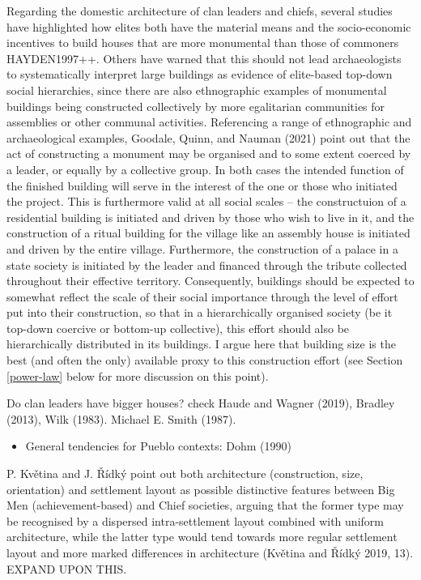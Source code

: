 \documentclass[
  12pt,
  a4paper, twoside]{book}
\providecommand{\tightlist}{%
  \setlength{\itemsep}{0pt}\setlength{\parskip}{0pt}}
\begin{document}
Regarding the domestic architecture of clan leaders and chiefs, several studies have highlighted how elites both have the material means and the socio-economic incentives to build houses that are more monumental than those of commoners HAYDEN1997++. Others have warned that this should not lead archaeologists to systematically interpret large buildings as evidence of elite-based top-down social hierarchies, since there are also ethnographic examples of monumental buildings being constructed collectively by more egalitarian communities for assemblies or other communal activities. Referencing a range of ethnographic and archaeological examples, Goodale, Quinn, and Nauman (2021) point out that the act of constructing a monument may be organised and to some extent coerced by a leader, or equally by a collective group. In both cases the intended function of the finished building will serve in the interest of the one or those who initiated the project. This is furthermore valid at all social scales -- the constructuion of a residential building is initiated and driven by those who wish to live in it, and the construction of a ritual building for the village like an assembly house is initiated and driven by the entire village. Furthermore, the construction of a palace in a state society is initiated by the leader and financed through the tribute collected throughout their effective territory. Consequently, buildings should be expected to somewhat reflect the scale of their social importance through the level of effort put into their construction, so that in a hierarchically organised society (be it top-down coercive or bottom-up collective), this effort should also be hierarchically distributed in its buildings. I argue here that building size is the best (and often the only) available proxy to this construction effort (see Section \ref{power-law} below for more discussion on this point).

Do clan leaders have bigger houses? check Haude and Wagner (2019), Bradley (2013), Wilk (1983). Michael E. Smith (1987).

\begin{itemize}
\tightlist
\item
  General tendencies for Pueblo contexts: Dohm (1990)
\end{itemize}

P. Květina and J. Řídký point out both architecture (construction, size, orientation) and settlement layout as possible distinctive features between Big Men (achievement-based) and Chief societies, arguing that the former type may be recognised by a dispersed intra-settlement layout combined with uniform architecture, while the latter type would tend towards more regular settlement layout and more marked differences in architecture (Květina and Řídký 2019, 13). EXPAND UPON THIS.
\end{document}
